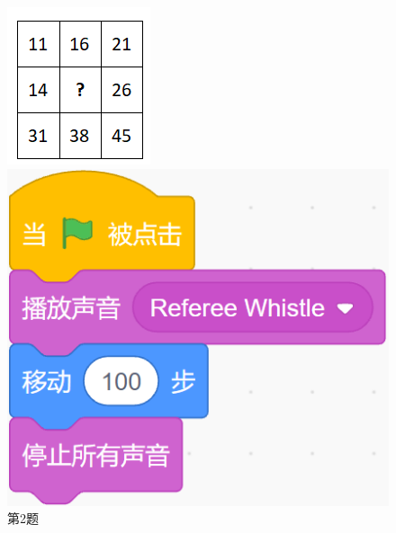 \documentclass[10pt, a4paper]{article}
\begin{document}
\begin{enumerate}
        \begin{figure}[htbp]
            \centering
            \begin{minipage}[t]{.12\textwidth}
                \centering
                \includegraphics[width=\textwidth]{2.png}
                \caption*{第2题}
            \end{minipage}
            \begin{minipage}[t]{.35\textwidth}
                \centering
                \begin{minipage}[t]{.48\textwidth}
                    \centering
                    \includegraphics[width=\textwidth]{3-1.png}

\end{minipage}
\end{minipage}
\end{figure}
\end{enumerate}
\end{document}
